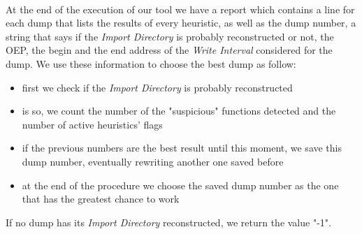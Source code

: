 \paragraph{}
At the end of the execution of our tool we have a report which contains a line for each dump that lists the results of every heuristic, as well as the dump number, a string that says if the \textit{Import Directory} is probably reconstructed or not, the OEP, the begin and the end address of the \textit{Write Interval} considered for the dump. We use these information to choose the best dump as follow:
\begin{itemize}
\item first we check if the \textit{Import Directory} is probably reconstructed
\item is so, we count the number of the "suspicious" functions detected and the number of active heuristics' flags
\item if the previous numbers are the best result until this moment, we save this dump number, eventually rewriting another one saved before
\item at the end of the procedure we choose the saved dump number as the one that has the greatest chance to work
\end{itemize}
If no dump has its \textit{Import Directory} reconstructed, we return the value "-1".